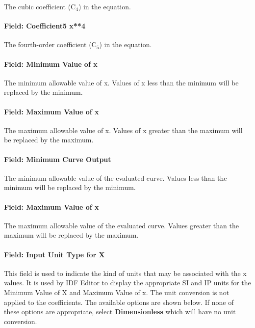 The cubic coefficient (C\(_{4}\)) in the equation.

\paragraph{Field: Coefficient5 x**4}\label{field-coefficient5-x4}

The fourth-order coefficient (C\(_{5}\)) in the equation.

\paragraph{Field: Minimum Value of x}\label{field-minimum-value-of-x-4}

The minimum allowable value of x. Values of x less than the minimum will be replaced by the minimum.

\paragraph{Field: Maximum Value of x}\label{field-maximum-value-of-x-4}

The maximum allowable value of x. Values of x greater than the maximum will be replaced by the maximum.

\paragraph{Field: Minimum Curve Output}\label{field-minimum-curve-output-3}

The minimum allowable value of the evaluated curve. Values less than the minimum will be replaced by the minimum.

\paragraph{Field: Maximum Value of x}\label{field-maximum-value-of-x-5}

The maximum allowable value of the evaluated curve. Values greater than the maximum will be replaced by the maximum.

\paragraph{Field: Input Unit Type for X}\label{field-input-unit-type-for-x-4}

This field is used to indicate the kind of units that may be associated with the x values. It is used by IDF Editor to display the appropriate SI and IP units for the Minimum Value of X and Maximum Value of x. The unit conversion is not applied to the coefficients. The available options are shown below. If none of these options are appropriate, select \textbf{Dimensionless} which will have no unit conversion.

